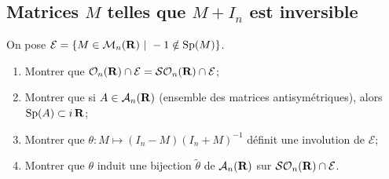 \subsection{Matrices $M$ telles que $M+I_n$ est inversible}
\begin{exercice}
	On pose $\mathcal E=\lbrace M\in\mathcal M_n(\operatorname{\mathbf{R}})\ |\ -1\notin \text{Sp}(M)\rbrace$.
	\begin{enumerate}
		\item Montrer que $\mathcal O_n(\operatorname{\mathbf{R}})\cap \mathcal E=\mathcal{SO}_n(\operatorname{\mathbf{R}})\cap \mathcal E$;
		\item Montrer que si $A\in\mathcal A_n(\operatorname{\mathbf{R}})$ (ensemble des matrices antisymétriques), alors $\operatorname{\mathrm{Sp}}(A)\subset i\operatorname{\mathbf{R}}$;
		\item Montrer que $\theta : M \mapsto (I_n-M)(I_n+M)^{-1}$ définit une involution de $\mathcal E$;
		\item Montrer que $\theta$ induit une bijection $\tilde\theta$ de $\mathcal A_n(\operatorname{\mathbf{R}})$ sur $\mathcal{SO}_n(\operatorname{\mathbf{R}})\cap \mathcal E$.
	\end{enumerate}
\end{exercice}

